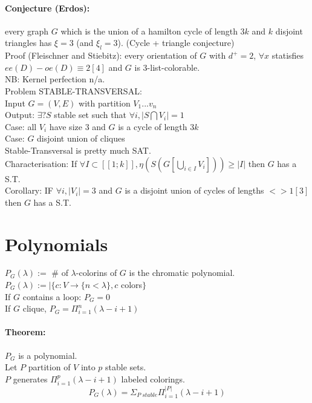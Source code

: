 \documentclass[12pt]{article}
\begin{document}
\paragraph{Conjecture (Erdos):} every graph $G$ which is the union of a hamilton cycle of length $3k$ and $k$ disjoint triangles has $\xi = 3$ (and $\xi_l = 3$). (Cycle + triangle conjecture)\\
Proof (Fleischner and Stiebitz): every orientation of $G$ with $d^+ = 2$, $\forall x$ statisfies $ee(D) -oe(D) \equiv 2 [4]$ and $G$ is 3-list-colorable.\\
NB: Kernel perfection n/a.\\
Problem STABLE-TRANSVERSAL:\\
Input $G=(V,E)$ with partition $V_1 ... v_n$\\
Output: $\exists?  S$ stable set such that $\forall i, |S \bigcap V_i| = 1$\\
Case: all $V_i$ have size $3$ and $G$ is a cycle of length $3k$\\
Case: $G$ disjoint union of cliques\\
Stable-Transversal is pretty much SAT.\\
Characterisation: If $\forall I \subset [[1;k]], \eta(S(G[\bigcup_{i \in I} V_i])) \geqslant |I|$ then $G$ has a S.T.\\
Corollary: IF $\forall i, |V_i| = 3$ and $G$ is a disjoint union of cycles of lengths $<> 1 [3]$ then $G$ has a S.T.\\


\section{Polynomials}
$P_G(\lambda) :=$ \# of $\lambda$-colorins of $G$ is the chromatic polynomial.\\
$P_G(\lambda) := |\{c : V \rightarrow \{n < \lambda\}, c$ colors$\}$\\
If $G$ contains a loop: $P_G = 0$\\
If $G$ clique, $P_G = \Pi_{i=1}^n (\lambda - i + 1)$\\

\paragraph{Theorem:} $P_G$ is a polynomial.\\
Let $P$ partition of $V$ into $p$ stable sets.\\
$P$ generates $\Pi_{i=1}^p (\lambda - i + 1)$ labeled colorings.\\
\[ P_G(\lambda) = \Sigma_{P \; stable} \Pi_{i=1}^{|P|} (\lambda -i + 1) \]
\end{document}
